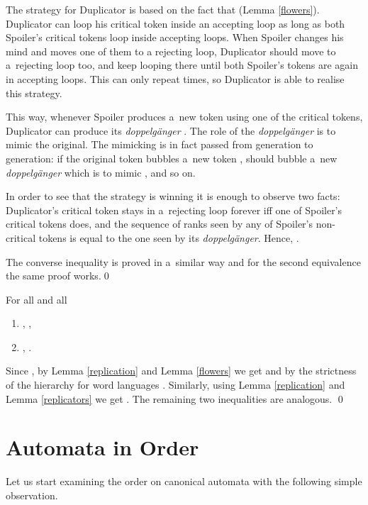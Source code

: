 \documentclass{LMCS}
\begin{document}
The strategy for Duplicator is based on the fact that  (Lemma \ref{flowers}). Duplicator can loop his critical token inside an accepting loop as long as both Spoiler's critical tokens loop inside accepting loops. When Spoiler changes his mind and moves one of them to a rejecting loop, Duplicator should move to a~rejecting loop too, and keep looping there until both Spoiler's tokens are again in accepting loops. This can only repeat  times, so Duplicator is able to realise this strategy. 

This way, whenever Spoiler produces a~new token  using one of the critical tokens, Duplicator can produce its {\em doppelg\"anger }. The role of the {\em doppelg\"anger} is to mimic the original.  The mimicking is in fact passed from generation to generation: if the original token bubbles a~new token ,  should bubble a~new {\em doppelg\"anger}  which is to mimic , and so on. 

In order to see that the strategy is winning it is enough to observe two facts: Duplicator's critical token stays in a~rejecting loop forever iff one of Spoiler's critical tokens does, and the sequence of ranks seen by any of Spoiler's non-critical tokens is equal to the one seen by its {\em doppelg\"anger}. Hence, . 

The converse inequality is proved in a~similar way and for the second equivalence the same proof works.\qed

\vspace{5pt}

\begin{cor} \label{hardautomata} For all   and all 
\begin{enumerate}[\em(1)] 
\item ,  , 
\item , . \end{enumerate}
\end{cor}

\proof Since ,  by Lemma \ref{replication} and  Lemma \ref{flowers} we get   and by the strictness of the hierarchy for word languages . Similarly, using Lemma \ref{replication} and Lemma \ref{replicators} we get . The remaining two inequalities are analogous. \qed



\section{Automata in Order} \label{automatainorder}


Let us start examining the order on canonical automata with the following simple observation.
\end{document}
